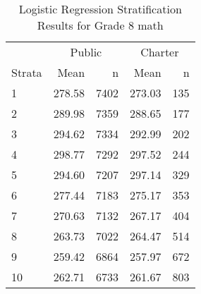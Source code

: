 \begin{table}[ht]
\centering
\caption{Logistic Regression Stratification Results for Grade 8 math} 
\label{g8math-circpsa10}
\begin{tabular}{lrr@{\extracolsep{.2cm}}rr}
  \hline
   & \multicolumn{2}{c}{Public} & \multicolumn{2}{c}{Charter} \\ \cline{2-3} \cline{4-5} Strata & Mean & n & Mean & n \\ \hline
1 & 278.58 & 7402 & 273.03 & 135 \\ 
  2 & 289.98 & 7359 & 288.65 & 177 \\ 
  3 & 294.62 & 7334 & 292.99 & 202 \\ 
  4 & 298.77 & 7292 & 297.52 & 244 \\ 
  5 & 294.60 & 7207 & 297.14 & 329 \\ 
  6 & 277.44 & 7183 & 275.17 & 353 \\ 
  7 & 270.63 & 7132 & 267.17 & 404 \\ 
  8 & 263.73 & 7022 & 264.47 & 514 \\ 
  9 & 259.42 & 6864 & 257.97 & 672 \\ 
  10 & 262.71 & 6733 & 261.67 & 803 \\ 
   \hline
\end{tabular}
\end{table}
